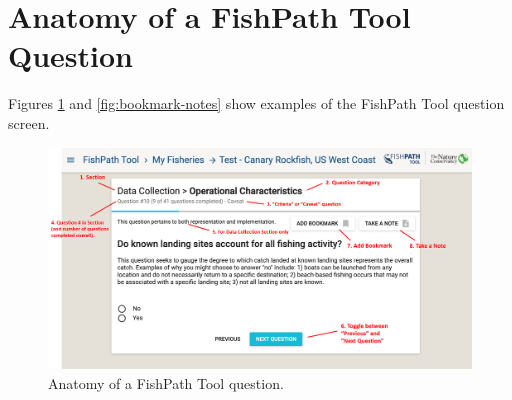 \documentclass[
  11pt,
]{book}
\begin{document}
\hypertarget{anatomy-of-a-fishpath-tool-question}{%
\section{Anatomy of a FishPath Tool Question}\label{anatomy-of-a-fishpath-tool-question}}

Figures \ref{fig:question-anatomy} and \ref{fig:bookmark-notes} show examples of the FishPath Tool question screen.

\begin{figure}
 
 {\centering \includegraphics[width=0.95\linewidth]{images/question-anatomy} 
 
 }
 
 \caption{Anatomy of a FishPath Tool question.}\label{fig:question-anatomy}
 \end{figure}
\end{document}
